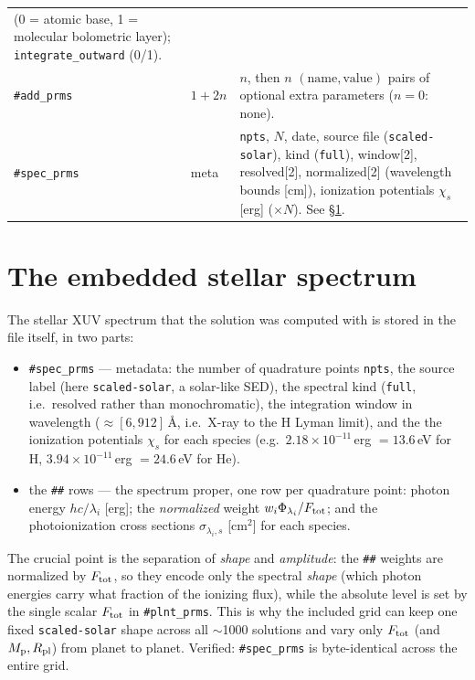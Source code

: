 \documentclass[english,a4paper]{my_memo}
\newcommand{\code}[1]{\texttt{#1}}
\newcommand{\Rp}{R_{\rm pl}}
\newcommand{\Ftot}{F_{\rm tot}}
\newcommand{\hd}[1]{\code{\##1}}      %
\begin{document}
\begin{table}[t]
\begin{tabular}{@{}l l p{8.4cm}@{}}
                     (0 = atomic base, 1 = molecular bolometric layer);
                     \code{integrate\_outward} (0/1). \\
\hd{add\_prms} & $1{+}2n$ & $n$, then $n$ $(\text{name},\text{value})$ pairs
                     of optional extra parameters ($n=0$: none). \\
\hd{spec\_prms}& meta & \code{npts}, $N$, date, source file
                     (\code{scaled-solar}), kind (\code{full}),
                     window[2], resolved[2], normalized[2] (wavelength
                     bounds [cm]), ionization potentials $\chi_s$ [erg]
                     ($\times N$). See \S\ref{sec:spec}. \\
\bottomrule
\end{tabular}
\end{table}

\section{The embedded stellar spectrum}
\label{sec:spec}
The stellar XUV spectrum that the solution was computed with is stored in
the file itself, in two parts:
\begin{itemize}\itemsep2pt
  \item \hd{spec\_prms} --- metadata: the number of quadrature points
        \code{npts}, the source label (here \code{scaled-solar}, a
        solar-like SED), the spectral kind (\code{full}, i.e.\ resolved
        rather than monochromatic), the integration window in wavelength
        ($\approx[6,912]\,$\AA, i.e.\ X-ray to the H Lyman limit), and the
        the ionization potentials $\chi_s$ for each species (e.g.\
        $2.18\times10^{-11}\,$erg $=13.6$\,eV for H,
        $3.94\times10^{-11}\,$erg $=24.6$\,eV for He).
  \item the \code{\#\#} rows --- the spectrum proper, one row per
        quadrature point: photon energy $hc/\lambda_i$ [erg]; the
        \emph{normalized} weight $w_i\Phi_{\lambda_i}/\Ftot$; and the
        photoionization cross sections $\sigma_{\lambda_i,s}$ [cm$^2$] for
        each species.
\end{itemize}
The crucial point is the separation of \emph{shape} and \emph{amplitude}:
the \code{\#\#} weights are normalized by $\Ftot$, so they encode only the
spectral \emph{shape} (which photon energies carry what fraction of the
ionizing flux), while the absolute level is set by the single scalar
$\Ftot$ in \hd{plnt\_prms}. This is why the included grid can keep one fixed
\code{scaled-solar} shape across all $\sim$1000 solutions and vary only
$\Ftot$ (and $M_{\rm p},\Rp$) from planet to planet. Verified: \hd{spec\_prms}
is byte-identical across the entire grid.
\end{document}
